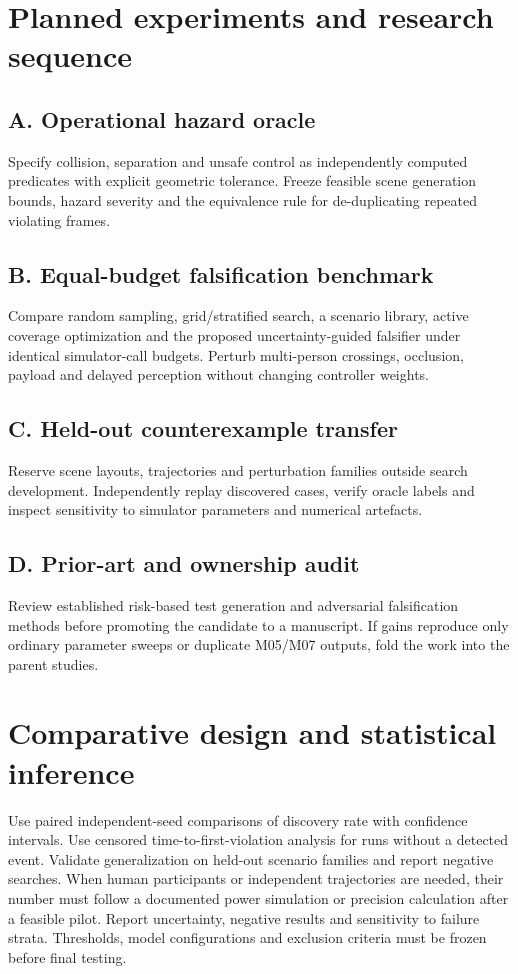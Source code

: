 \documentclass[11pt,a4paper]{article}
\begin{document}
\section{Planned experiments and research sequence}
\subsection{A. Operational hazard oracle}
Specify collision, separation and unsafe control as independently computed predicates with explicit geometric tolerance. Freeze feasible scene generation bounds, hazard severity and the equivalence rule for de-duplicating repeated violating frames.

\subsection{B. Equal-budget falsification benchmark}
Compare random sampling, grid/stratified search, a scenario library, active coverage optimization and the proposed uncertainty-guided falsifier under identical simulator-call budgets. Perturb multi-person crossings, occlusion, payload and delayed perception without changing controller weights.

\subsection{C. Held-out counterexample transfer}
Reserve scene layouts, trajectories and perturbation families outside search development. Independently replay discovered cases, verify oracle labels and inspect sensitivity to simulator parameters and numerical artefacts.

\subsection{D. Prior-art and ownership audit}
Review established risk-based test generation and adversarial falsification methods before promoting the candidate to a manuscript. If gains reproduce only ordinary parameter sweeps or duplicate M05/M07 outputs, fold the work into the parent studies.

\section{Comparative design and statistical inference}
Use paired independent-seed comparisons of discovery rate with confidence intervals. Use censored time-to-first-violation analysis for runs without a detected event. Validate generalization on held-out scenario families and report negative searches. When human participants or independent trajectories are needed, their number must follow a documented power simulation or precision calculation after a feasible pilot. Report uncertainty, negative results and sensitivity to failure strata. Thresholds, model configurations and exclusion criteria must be frozen before final testing.
\end{document}
